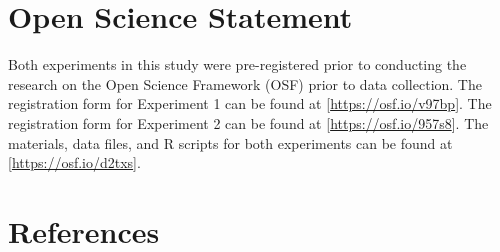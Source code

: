 \documentclass[
  english,
  man,floatsintext]{apa6}
\begin{document}
\newpage

\hypertarget{open-science-statement}{%
\section{Open Science Statement}\label{open-science-statement}}

Both experiments in this study were pre-registered prior to conducting the research on the Open Science Framework (OSF) prior to data collection. The registration form for Experiment 1 can be found at {[}\url{https://osf.io/v97bp}{]}. The registration form for Experiment 2 can be found at {[}\url{https://osf.io/957s8}{]}. The materials, data files, and R scripts for both experiments can be found at {[}\url{https://osf.io/d2txs}{]}.

\newpage

\hypertarget{references}{%
\section{References}\label{references}}

\begingroup
\setlength{\parindent}{-0.5in}
\setlength{\leftskip}{0.5in}
\end{document}
